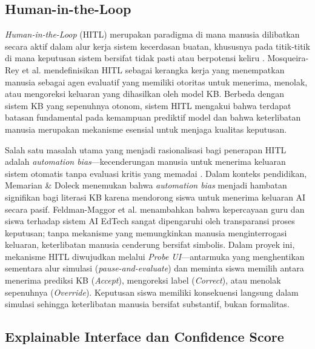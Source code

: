 \documentclass[12pt,a4paper,oneside,openany]{report}
\begin{document}
\subsection{Human-in-the-Loop}
\label{subsec:hitl}

\textit{Human-in-the-Loop} (HITL) merupakan paradigma di mana manusia dilibatkan secara aktif dalam alur kerja sistem kecerdasan buatan, khususnya pada titik-titik di mana keputusan sistem bersifat tidak pasti atau berpotensi keliru \cite{ref4}. Mosqueira-Rey et al. \cite{ref4} mendefinisikan HITL sebagai kerangka kerja yang menempatkan manusia sebagai agen evaluatif yang memiliki otoritas untuk menerima, menolak, atau mengoreksi keluaran yang dihasilkan oleh model KB. Berbeda dengan sistem KB yang sepenuhnya otonom, sistem HITL mengakui bahwa terdapat batasan fundamental pada kemampuan prediktif model dan bahwa keterlibatan manusia merupakan mekanisme esensial untuk menjaga kualitas keputusan.

Salah satu masalah utama yang menjadi rasionalisasi bagi penerapan HITL adalah \textit{automation bias}---kecenderungan manusia untuk menerima keluaran sistem otomatis tanpa evaluasi kritis yang memadai \cite{ref4}. Dalam konteks pendidikan, Memarian \& Doleck \cite{ref5} menemukan bahwa \textit{automation bias} menjadi hambatan signifikan bagi literasi KB karena mendorong siswa untuk menerima keluaran AI secara pasif. Feldman-Maggor et al. \cite{ref25} menambahkan bahwa kepercayaan guru dan siswa terhadap sistem AI EdTech sangat dipengaruhi oleh transparansi proses keputusan; tanpa mekanisme yang memungkinkan manusia menginterrogasi keluaran, keterlibatan manusia cenderung bersifat simbolis. Dalam proyek ini, mekanisme HITL diwujudkan melalui \textit{Probe UI}---antarmuka yang menghentikan sementara alur simulasi (\textit{pause-and-evaluate}) dan meminta siswa memilih antara menerima prediksi KB (\textit{Accept}), mengoreksi label (\textit{Correct}), atau menolak sepenuhnya (\textit{Override}). Keputusan siswa memiliki konsekuensi langsung dalam simulasi sehingga keterlibatan manusia bersifat substantif, bukan formalitas.

\subsection{Explainable Interface dan Confidence Score}
\label{subsec:explainable-interface}
\end{document}
